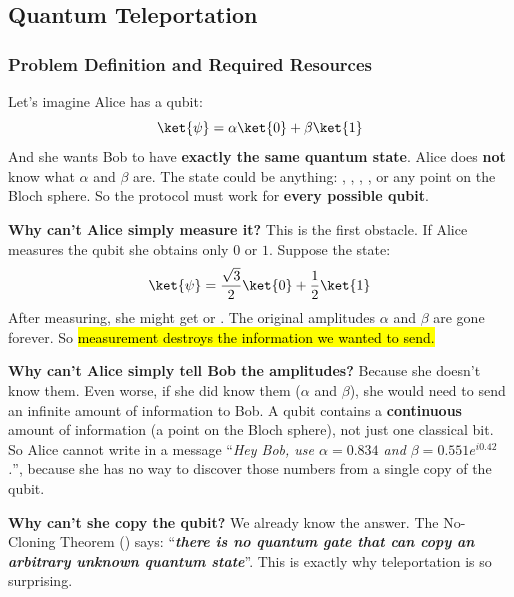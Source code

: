\subsection{Quantum Teleportation}\label{ex:quantum-teleportation}

\subsubsection{Problem Definition and Required Resources}\label{ex:problem-definition-and-required-resources}

Let's imagine Alice has a qubit:
\begin{equation*}
    \ket{\psi} = \alpha\ket{0} + \beta\ket{1}
\end{equation*}
And she wants Bob to have \textbf{exactly the same quantum state}. Alice does \textbf{not} know what $\alpha$ and $\beta$ are. The state could be anything: , , \ket{+}, \ket{-}, or any point on the Bloch sphere. So the protocol must work for \textbf{every possible qubit}.

\highspace
\textcolor{Green3}{ \textbf{Why can't Alice simply measure it?}} This is the first obstacle. If Alice measures the qubit she obtains only $0$ or $1$. Suppose the state:
\begin{equation*}
    \ket{\psi} = \frac{\sqrt{3}}{2}\ket{0} + \frac{1}{2}\ket{1}
\end{equation*}
After measuring, she might get  or . The original amplitudes $\alpha$ and $\beta$ are gone forever. So \hl{measurement destroys the information we wanted to send.}

\highspace
\textcolor{Green3}{ \textbf{Why can't Alice simply tell Bob the amplitudes?}} Because she doesn't know them. Even worse, if she did know them ($\alpha$ and $\beta$), she would need to send an infinite amount of information to Bob. A qubit contains a \textbf{continuous} amount of information (a point on the Bloch sphere), not just one classical bit. So Alice cannot write in a message ``\emph{Hey Bob, use $\alpha = 0.834$ and $\beta = 0.551e^{i0.42}$.}'', because she has no way to discover those numbers from a single copy of the qubit.

\highspace
\textcolor{Green3}{ \textbf{Why can't she copy the qubit?}} We already know the answer. The No-Cloning Theorem () says: ``\emph{\textbf{there is no quantum gate that can copy an arbitrary unknown quantum state}}''. This is exactly why teleportation is so surprising.

